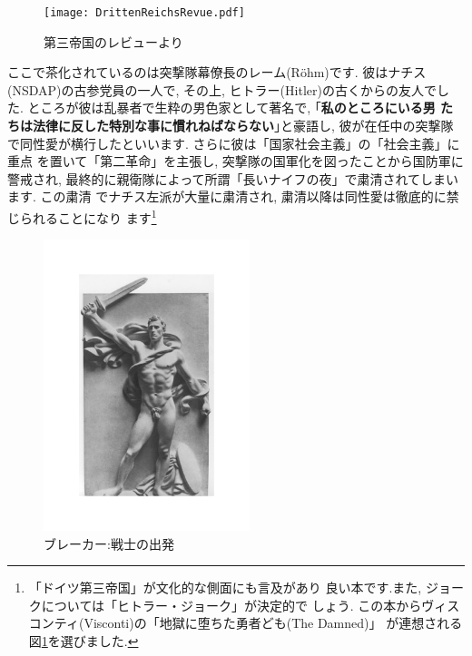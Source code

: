 \begin{figure}[htbp]
\begin{center}
\texttt{[image: DrittenReichsRevue.pdf]}
\caption{第三帝国のレビューより\cite{関}}
\label{fig:rrevue}
\end{center}
\end{figure}

ここで茶化されているのは突撃隊幕僚長のレーム(R\"ohm)です. 彼はナチス
(NSDAP)の古参党員の一人で, その上, ヒトラー(Hitler)の古くからの友人でした.
 ところが彼は乱暴者で生粋の男色家として著名で, ｢\textbf{私のところにいる男
 たちは法律に反した特別な事に慣れねばならない}｣と豪語し, 彼が在任中の突撃隊
で同性愛が横行したといいます. さらに彼は「国家社会主義」の「社会主義」に重点
を置いて「第二革命」を主張し, 突撃隊の国軍化を図ったことから国防軍に警戒され,
最終的に親衛隊によって所謂「長いナイフの夜」で粛清されてしまいます. この粛清
でナチス左派が大量に粛清され, 粛清以降は同性愛は徹底的に禁じられることになり
ます\footnote{「ドイツ第三帝国」\cite{クラーザー}が文化的な側面にも言及があり
良い本です.また, ジョークについては「ヒトラー・ジョーク」\cite{関}が決定的で
しょう. この本からヴィスコンティ(Visconti)の「地獄に堕ちた勇者ども(The Damned)」
が連想される図\ref{fig:rrevue}を選びました.}
\newpage

\begin{figure}
\includegraphics[width=6cm]{Breker2_relief.pdf}
\caption{ブレーカー:戦士の出発}
\label{fig:breker1}
\end{figure}


